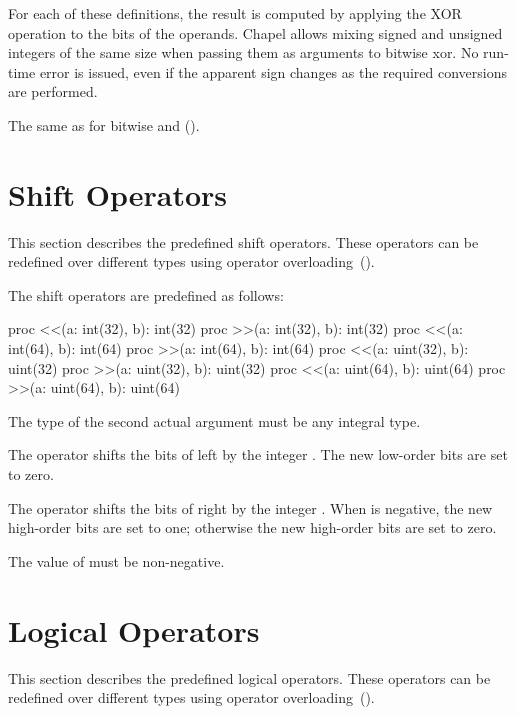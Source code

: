 For each of these definitions, the result is
computed by applying the XOR operation to the bits of the operands.
Chapel allows mixing signed and unsigned integers of the same size
when passing them as arguments to bitwise xor.
No run-time error is issued, even if the apparent sign changes as the required
conversions are performed.

\begin{rationale}
The same as for bitwise and ().
\end{rationale}

\section{Shift Operators}
\label{Shift_Operators}

This section describes the predefined shift operators.  These
operators can be redefined over different types using operator
overloading~().

The shift operators are predefined as follows:
\begin{chapel}
proc <<(a: int(32), b): int(32)
proc >>(a: int(32), b): int(32)
proc <<(a: int(64), b): int(64)
proc >>(a: int(64), b): int(64)
proc <<(a: uint(32), b): uint(32)
proc >>(a: uint(32), b): uint(32)
proc <<(a: uint(64), b): uint(64)
proc >>(a: uint(64), b): uint(64)
\end{chapel}
The type of the second actual argument must be any integral type.

The \chpl{<<} operator shifts the bits of  left by the
integer .  The new low-order bits are set to zero.

The \chpl{>>} operator shifts the bits of  right by the
integer .  When  is negative, the new high-order bits
are set to one; otherwise the new high-order bits are set to zero.

The value of  must be non-negative.

\section{Logical Operators}
\label{Logical_Operators}

This section describes the predefined logical operators.  These
operators can be redefined over different types using operator
overloading~().

